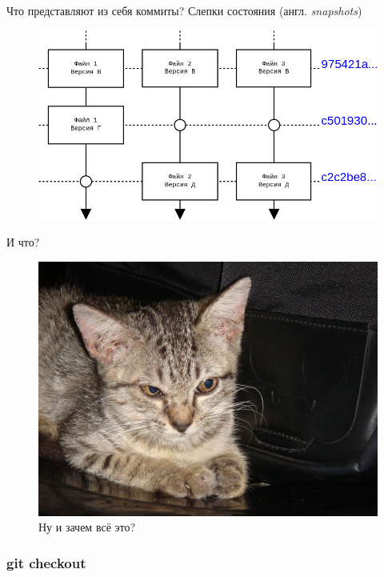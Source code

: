 \documentclass[presentation]{beamer}
\begin{document}
\begin{frame}{Что представляют из себя коммиты?}
  \center \LARGE Слепки состояния (англ. \emph{snapshots})
  \begin{figure}[htb]
    \centering
    \includegraphics[width=.8\textwidth]{git-snapshots}
  \end{figure}
\end{frame}

\begin{frame}{И что?}
  \begin{figure}[htb]
    \centering
    \includegraphics[width=.8\textwidth]{kucing-belang-perang}
    \caption{\LARGE Ну и зачем всё это?}
  \end{figure}
\end{frame}



\subsubsection{git checkout}
\end{document}
